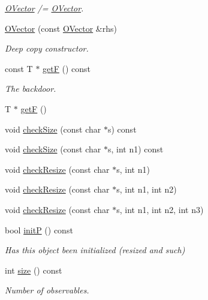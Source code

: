 \begin{DoxyCompactItemize}
\begin{DoxyCompactList}\small\item\em \mbox{\hyperlink{classENSEM_1_1OVector}{O\+Vector}} /= \mbox{\hyperlink{classENSEM_1_1OVector}{O\+Vector}}. \end{DoxyCompactList}\item 
\mbox{\hyperlink{classENSEM_1_1OVector_a10129359c78668211e551f3b13829208}{O\+Vector}} (const \mbox{\hyperlink{classENSEM_1_1OVector}{O\+Vector}} \&rhs)
\begin{DoxyCompactList}\small\item\em Deep copy constructor. \end{DoxyCompactList}\item 
const T $\ast$ \mbox{\hyperlink{classENSEM_1_1OVector_ab4767b83741c029b996a49662c021f88}{getF}} () const
\begin{DoxyCompactList}\small\item\em The backdoor. \end{DoxyCompactList}\item 
T $\ast$ \mbox{\hyperlink{classENSEM_1_1OVector_a73065fd6ed2149ce8699996d691c4c42}{getF}} ()
\item 
void \mbox{\hyperlink{classENSEM_1_1OVector_a12d09a71bb2808a7404578da9ba41c4f}{check\+Size}} (const char $\ast$s) const
\item 
void \mbox{\hyperlink{classENSEM_1_1OVector_a1446ad09778db3a287fb5f6fec304b22}{check\+Size}} (const char $\ast$s, int n1) const
\item 
void \mbox{\hyperlink{classENSEM_1_1OVector_a95545451bb9d6be83ba32ad3dc2dab42}{check\+Resize}} (const char $\ast$s, int n1)
\item 
void \mbox{\hyperlink{classENSEM_1_1OVector_acd8960fbc5b7df8aabf14ca8ca50f7ab}{check\+Resize}} (const char $\ast$s, int n1, int n2)
\item 
void \mbox{\hyperlink{classENSEM_1_1OVector_ac909025f6c5d78479f5dcbef8151d571}{check\+Resize}} (const char $\ast$s, int n1, int n2, int n3)
\item 
bool \mbox{\hyperlink{classENSEM_1_1OVector_ae1c9e62826d9b61edc7f85d8f8aedf79}{initP}} () const
\begin{DoxyCompactList}\small\item\em Has this object been initialized (resized and such) \end{DoxyCompactList}\item 
int \mbox{\hyperlink{classENSEM_1_1OVector_a715979c319905eb60532815bb3c77aab}{size}} () const
\begin{DoxyCompactList}\small\item\em Number of observables. \end{DoxyCompactList}\item 

\end{DoxyCompactItemize}

